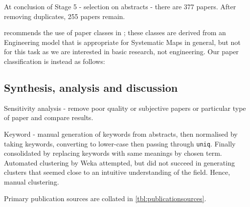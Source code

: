 At conclusion of Stage 5 - selection on abstracts - there are 377 papers.
After removing duplicates, 255 papers remain.

\cite{Petersen:2008fk} recommends the use of paper classes in \cite{Wieringa:2006ly}; these classes are derived from an Engineering model that is appropriate for Systematic Maps in general, but not for this task as we are interested in basic research, not engineering. Our paper classification is instead as follows:

\subsection{Synthesis, analysis and discussion}

Sensitivity analysis - remove poor quality or subjective papers or particular type of paper and compare results.


Keyword - manual generation of keywords from abstracts, then normalised by taking keywords, converting to lower-case then passing through \verb+uniq+. Finally consolidated by replacing keywords with same meanings by chosen term. Automated clustering by Weka attempted, but did not succeed in generating clusters that seemed close to an intuitive understanding of the field. Hence, manual clustering.


Primary publication sources are collated in \ref{tbl:publicationsources}.

